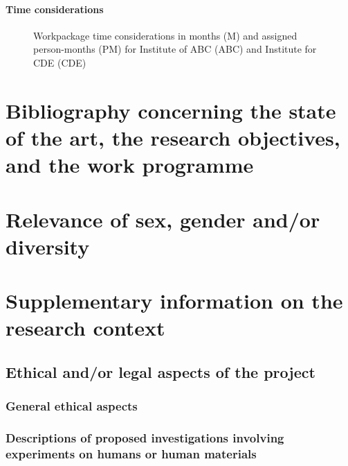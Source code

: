 \documentclass{scrartcl}
\begin{document}
\paragraph*{Time considerations}
\vspace{-0.5cm}
\begin{figure}[h]
	\centering
  	\resizebox{\textwidth}{!}{}
	\caption{Workpackage time considerations in months (M) and assigned person-months (PM) for Institute of ABC (ABC) and Institute for CDE (CDE)}
	\label{fig:timeline}
\end{figure}


\section{Bibliography concerning the state of the art, the research objectives, and the work programme}
\label{sec:bib}
\printbibliography[notcategory=reviewed, notcategory=nonreviewed, notcategory=patents_pending, notcategory=patents, heading=none]

\section{Relevance of sex, gender and/or diversity}


\clearpage
\section{Supplementary information on the research context}

\subsection{Ethical and/or legal aspects of the project}

\subsubsection{General ethical aspects}

\subsubsection{Descriptions of proposed investigations involving experiments on humans or human materials}
\end{document}
